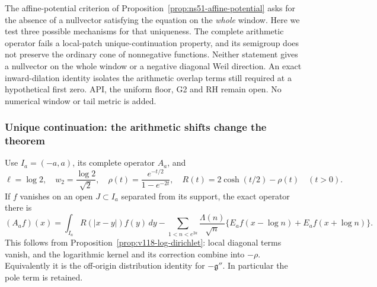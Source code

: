 \documentclass[11pt]{article}
\theoremstyle{remark}
\begin{document}
The affine-potential criterion of Proposition~\ref{prop:ns51-affine-potential}
asks for the absence of a nullvector satisfying the equation on the
\emph{whole} window. Here we test three possible mechanisms for that
uniqueness. The complete arithmetic operator fails a local-patch
unique-continuation property, and its semigroup does not preserve the
ordinary cone of nonnegative functions. Neither statement gives a
nullvector on the whole window or a negative diagonal Weil direction.
An exact inward-dilation identity isolates the arithmetic overlap
terms still required at a hypothetical first zero. API, the uniform
floor, G2 and RH remain open. No numerical window or tail metric is added.

\subsubsection*{Unique continuation: the arithmetic shifts change the theorem}

Use $I_a=(-a,a)$, its complete operator $A_a$, and
\[
 \ell=\log2,\quad w_2=\frac{\log2}{\sqrt2},\quad
 \rho(t)=\frac{e^{-t/2}}{1-e^{-2t}},\quad
 R(t)=2\cosh(t/2)-\rho(t)\quad(t>0).
\]
If $f$ vanishes on an open $J\subset I_a$ separated from its support,
the exact operator there is
\begin{equation}\label{eq:ns55-off-support-operator}
 (A_af)(x)=\int_{I_a}R(|x-y|)f(y)\,dy
 -\sum_{1<n<e^{2a}}\frac{\Lambda(n)}{\sqrt n}
       \{E_af(x-\log n)+E_af(x+\log n)\}.
\end{equation}
This follows from Proposition~\ref{prop:v118-log-dirichlet}: local
diagonal terms vanish, and the logarithmic kernel and its correction
combine into $-\rho$. Equivalently it is the off-origin distribution
identity for $-\mathfrak g''$. In particular the pole term is retained.
\end{document}
